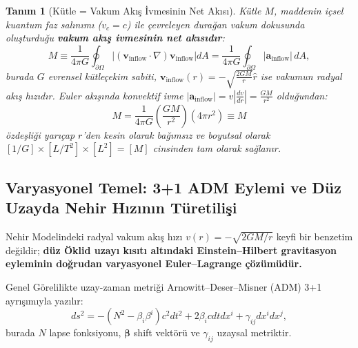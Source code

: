 \documentclass[11pt,a4paper]{article}
\newtheorem{definition}{Tanım}[section]
\begin{document}
\begin{definition}[Kütle = Vakum Akış İvmesinin Net Akısı]
    \label{def:kutle_tanim_p1}
    Kütle $M$, maddenin içsel kuantum faz salınımı ($v_c = c$) ile çevreleyen durağan vakum dokusunda oluşturduğu \textbf{vakum akış ivmesinin net akısıdır}:
    \begin{equation}
        M \equiv \frac{1}{4\pi G} \oint_{\partial \Omega} \left| (\mathbf{v}_{\mathrm{inflow}} \cdot \nabla) \mathbf{v}_{\mathrm{inflow}} \right| dA = \frac{1}{4\pi G} \oint_{\partial \Omega} |\mathbf{a}_{\mathrm{inflow}}| \, dA,
        \label{eq:kutle_akisi}
    \end{equation}
    burada $G$ evrensel kütleçekim sabiti, $\mathbf{v}_{\mathrm{inflow}}(r) = -\sqrt{\frac{2GM}{r}}\hat{r}$ ise vakumun radyal akış hızıdır. Euler akışında konvektif ivme $|\mathbf{a}_{\mathrm{inflow}}| = v \left|\frac{dv}{dr}\right| = \frac{GM}{r^2}$ olduğundan:
    \begin{equation}
        M = \frac{1}{4\pi G} \left( \frac{GM}{r^2} \right) (4\pi r^2) \equiv M
    \end{equation}
    özdeşliği yarıçap $r$'den kesin olarak bağımsız ve boyutsal olarak $[1/G] \times [L/T^2] \times [L^2] = [M]$ cinsinden tam olarak sağlanır.
\end{definition}

\subsection{Varyasyonel Temel: 3+1 ADM Eylemi ve Düz Uzayda Nehir Hızının Türetilişi}
\label{sec:adm_eylem_p1}
Nehir Modelindeki radyal vakum akış hızı $v(r) = -\sqrt{2GM/r}$ keyfi bir benzetim değildir; \textbf{düz Öklid uzayı kısıtı altındaki Einstein--Hilbert gravitasyon eyleminin doğrudan varyasyonel Euler--Lagrange çözümüdür.}

Genel Görelilikte uzay-zaman metriği Arnowitt--Deser--Misner (ADM) 3+1 ayrışımıyla yazılır:
\begin{equation}
    ds^2 = -\left(N^2 - \beta_i \beta^i\right) c^2 dt^2 + 2 \beta_i c dt dx^i + \gamma_{ij} dx^i dx^j,
    \label{eq:adm_metrik_p1}
\end{equation}
burada $N$ lapse fonksiyonu, $\boldsymbol{\beta}$ shift vektörü ve $\gamma_{ij}$ uzaysal metriktir.
\end{document}
